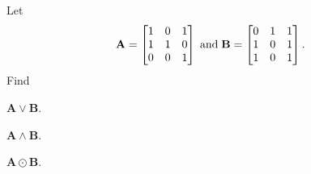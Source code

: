
%
%
%

	Let
	$$
	\mathbf{A} =
	\begin{bmatrix}
		1 & 0 & 1 \\ 1 & 1 & 0 \\ 0 & 0 & 1
	\end{bmatrix}
	\text{\;and\;}
	\mathbf{B} =
	\begin{bmatrix}
		0 & 1 & 1 \\ 1 & 0 & 1 \\ 1 & 0 & 1
	\end{bmatrix}.
	$$
	Find
	\begin{subproblem}
		\item $\mathbf{A} \lor \mathbf{B}$.
		\item $\mathbf{A} \land \mathbf{B}$.
		\item $\mathbf{A} \odot \mathbf{B}$.
	\end{subproblem}

\solution
	\begin{subproblem}
		\item 
		\item 
		\item 
	\end{subproblem}

